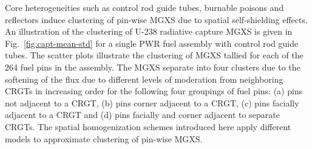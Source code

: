 \documentclass[12pt,twoside]{mitthesis-exec}
\begin{document}
Core heterogeneities such as control rod guide tubes, burnable poisons and reflectors induce clustering of pin-wise MGXS due to spatial self-shielding effects. An illustration of the clustering of U-238 radiative capture MGXS is given in Fig.~\ref{fig:capt-mean-std} for a single PWR fuel assembly with control rod guide tubes. The scatter plots illustrate the clustering of MGXS tallied for each of the 264 fuel pins in the assembly. The MGXS separate into four clusters due to the softening of the flux due to different levels of moderation from neighboring CRGTs in increasing order for the following four groupings of fuel pins: (a) pins not adjacent to a CRGT, (b) pins corner adjacent to a CRGT, (c) pins facially adjacent to a CRGT and (d) pins facially and corner adjacent to separate CRGTs. The spatial homogenization schemes introduced here apply different models to approximate clustering of pin-wise MGXS.

\end{document}
